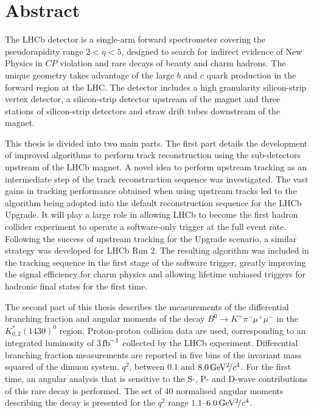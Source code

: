\section*{Abstract}

The LHCb detector is a single-arm forward spectrometer covering the pseudorapidity range $2 < \eta < 5$, designed to search for indirect evidence of New Physics in $C\!P$ violation and rare decays of beauty and charm hadrons. The unique geometry takes advantage of the large $b$ and $c$ quark production in the forward region at the LHC. The detector includes a high granularity silicon-strip vertex detector, a silicon-strip detector upstream of the magnet and three stations of silicon-strip detectors and straw drift tubes downstream of the magnet.

This thesis is divided into two main parts. The first part details the development of improved algorithms to perform track reconstruction using the sub-detectors upstream of the LHCb magnet. A novel idea to perform upstream tracking as an intermediate step of the track reconstruction sequence was investigated. The vast gains in tracking performance obtained when using upstream tracks led to the algorithm being adopted into the default reconstruction sequence for the LHCb Upgrade. It will play a large role in allowing LHCb to become the first hadron collider experiment to operate a software-only trigger at the full event rate. Following the success of upstream tracking for the Upgrade scenario, a similar strategy was developed for LHCb Run 2. The resulting algorithm was included in the tracking sequence in the first stage of the software trigger, greatly improving the signal efficiency for charm physics and allowing lifetime unbiased triggers for hadronic final states for the first time.

The second part of this thesis describes the measurements of the differential branching fraction and angular moments of the decay $B^{0} \to K^{+}\pi^{-}\mu^{+}\mu^{-}$ in the $K^{*}_{0,2}(1430)^{0}$ region. Proton-proton collision data are used, corresponding to an integrated luminosity of 3$\mbox{\,fb}^{-1}$ collected by the LHCb experiment. Differential branching fraction measurements are reported in five bins of the invariant mass squared of the dimuon system, $q^{2}$, between $0.1$ and $8.0{\mathrm{\,Ge\kern -0.1em V^2\!/}c^4}$. For the first time, an angular analysis that is sensitive to the S-, P- and D-wave contributions of this rare decay is performed. The set of 40 normalised angular moments describing the decay is presented for the $q^{2}$ range $1.1$--$6.0{\mathrm{\,Ge\kern -0.1em V^2\!/}c^4}$. 

